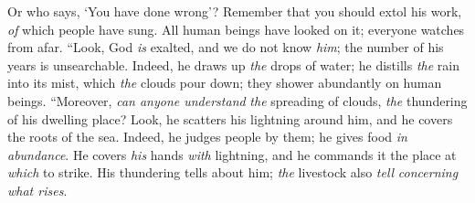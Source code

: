 \begin{biblechapter}
Or who says, ‘You have done wrong’?
\verse Remember that you should extol his work, 
\textit{of} which people have sung.
\verse All human beings have looked on it; 
everyone watches from afar.
\verse “Look, God \textit{is} exalted, and we do not know \textit{him}; 
the number of his years is unsearchable.
\verse Indeed, he draws up \textit{the} drops of water; 
he distills \textit{the} rain into its mist,
\verse which \textit{the} clouds pour down; 
they shower abundantly on human beings.
\verse “Moreover, \textit{can anyone understand} \textit{the} spreading of clouds, 
\textit{the} thundering of his dwelling place?
\verse Look, he scatters his lightning around him, 
and he covers the roots of the sea.
\verse Indeed, he judges people by them; 
he gives food \textit{in abundance}.
\verse He covers \textit{his} hands \textit{with} lightning, 
and he commands it the place at \textit{which} to strike.
\verse His thundering tells about him; 
\textit{the} livestock also \textit{tell} \textit{concerning what rises}.
\end{biblechapter}

